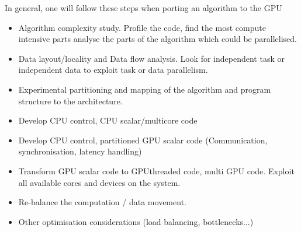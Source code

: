 In general, one will follow these steps when porting an algorithm to the \gls{GPU}
\begin{itemize}
	\item Algorithm complexity study. Profile the code, find the most compute
intensive parts analyse the parts of the algorithm which could be parallelised.
	\item Data layout/locality and Data flow analysis. Look for independent task or 
	independent data to exploit task or data parallelism.
	\item Experimental partitioning and mapping of the algorithm and program 
		structure to the architecture. 
	\item Develop \gls{CPU} control, \gls{CPU} scalar/multicore code
	\item Develop \gls{CPU} control, partitioned \gls{GPU} scalar code (Communication, 
		synchronisation, latency handling)
	\item Transform \gls{GPU} scalar code to \gls{GPU}threaded code, multi \gls{GPU} code. 
	Exploit all available cores and devices on the system. 
	\item Re-balance the computation / data movement. 
	\item Other optimisation considerations (load balancing, bottlenecks...)
\end{itemize}


